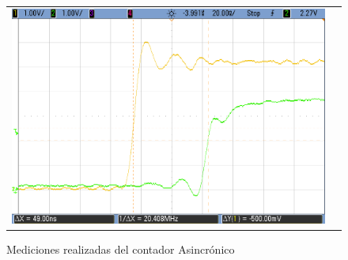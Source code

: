 \begin{figure}[H]
\begin{tabular}{c c}
            \includegraphics[scale=0.2]{../EJ7/Mediciones/Osciloscopio/Asincronico/cropped_salida_q2.png}
        \end{tabular}
    \caption{Mediciones realizadas del contador Asincr\'onico}
    \label{fig:asincronico_mediciones}
\end{figure}

